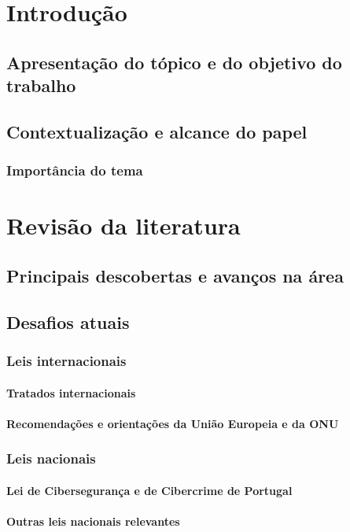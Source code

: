 \chapter{Introdução}
\section{Apresentação do tópico e do objetivo do trabalho}
\section{Contextualização e alcance do papel}
\subsection{Importância do tema}

\chapter{Revisão da literatura}
\section{Principais descobertas e avanços na área}
\section{Desafios atuais}
\subsection{Leis internacionais}
\subsubsection{Tratados internacionais}
\subsubsection{Recomendações e orientações da União Europeia e da ONU}
\subsection{Leis nacionais}
\subsubsection{Lei de Cibersegurança e de Cibercrime de Portugal}
\subsubsection{Outras leis nacionais relevantes}
